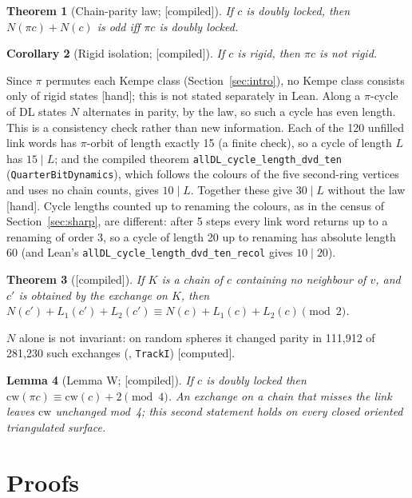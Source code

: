 \documentclass[11pt]{article}
\newtheorem{theorem}{Theorem}
\newtheorem{corollary}[theorem]{Corollary}
\newtheorem{lemma}[theorem]{Lemma}
\theoremstyle{definition}
\newcommand{\lab}[1]{\textsf{[#1]}}
\newcommand{\lean}[1]{\texttt{#1}}
\newcommand{\cw}{\mathrm{cw}}
\begin{document}
\begin{theorem}[Chain-parity law; \lab{compiled}]\label{thm:law}
If $c$ is doubly locked, then $N(\pi c)+N(c)$ is odd iff $\pi c$ is doubly locked.
\end{theorem}

\begin{corollary}[Rigid isolation; \lab{compiled}]\label{cor:RI}
If $c$ is rigid, then $\pi c$ is not rigid.
\end{corollary}
Since $\pi$ permutes each Kempe class (Section~\ref{sec:intro}), no Kempe class consists only of rigid states \lab{hand}; this is not stated separately in Lean. Along a $\pi$-cycle of DL states $N$ alternates in parity, by the law, so such a cycle has even length. This is a consistency check rather than new information. Each of the 120 unfilled link words has $\pi$-orbit of length exactly 15 (a finite check), so a cycle of length $L$ has $15\mid L$; and the compiled theorem \lean{allDL\_cycle\_length\_dvd\_ten} (\lean{QuarterBitDynamics}), which follows the colours of the five second-ring vertices and uses no chain counts, gives $10\mid L$. Together these give $30\mid L$ without the law \lab{hand}. Cycle lengths counted up to renaming the colours, as in the census of Section~\ref{sec:sharp}, are different: after 5 steps every link word returns up to a renaming of order 3, so a cycle of length 20 up to renaming has absolute length 60 (and Lean's \lean{allDL\_cycle\_length\_dvd\_ten\_recol} gives $10\mid 20$).

\begin{theorem}[\lab{compiled}]\label{thm:R7}
If $K$ is a chain of $c$ containing no neighbour of $v$, and $c'$ is obtained by the exchange on $K$, then $N(c')+L_1(c')+L_2(c')\equiv N(c)+L_1(c)+L_2(c)\pmod 2$.
\end{theorem}
$N$ alone is not invariant: on random spheres it changed parity in 111,912 of 281,230 such exchanges (\cite{record}, \texttt{TrackI}) \lab{computed}.

\begin{lemma}[Lemma W; \lab{compiled}]\label{lem:W}
If $c$ is doubly locked then $\cw(\pi c)\equiv\cw(c)+2\pmod 4$. An exchange on a chain that misses the link leaves $\cw$ unchanged mod~4; this second statement holds on every closed oriented triangulated surface.
\end{lemma}

\section{Proofs}\label{sec:proofs}
\end{document}
